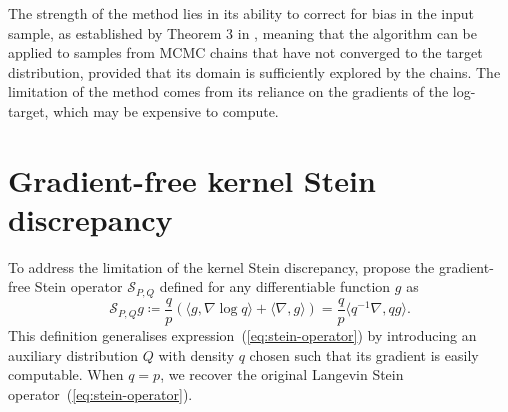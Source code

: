 \documentclass[11pt,a4paper]{report}
\begin{document}
The strength of the method lies in its ability to correct for bias in the input sample, as established by Theorem 3 in \cite{riabizOptimalThinningMCMC2022}, meaning that the algorithm can be applied to samples from MCMC chains that have not converged to the target distribution, provided that its domain is sufficiently explored by the chains. The limitation of the method comes from its reliance on the gradients of the log-target, which may be expensive to compute.

\section{Gradient-free kernel Stein discrepancy}


To address the limitation of the kernel Stein discrepancy, \cite{fisherGradientFreeKernelStein2024} propose the gradient-free Stein operator $\mathcal{S}_{P,Q}$ defined for any differentiable function $g$ as
\begin{equation}
\mathcal{S}_{P,Q} g \coloneq \frac{q}{p}(\langle g, \nabla \log q \rangle + \langle \nabla, g \rangle) = \frac{q}{p} \langle q^{-1}\nabla, q g \rangle.
\end{equation}
This definition generalises expression~(\ref{eq:stein-operator}) by introducing an auxiliary distribution $Q$ with density $q$ chosen such that its gradient is easily computable. When $q = p$, we recover the original Langevin Stein operator~(\ref{eq:stein-operator}).
\end{document}
